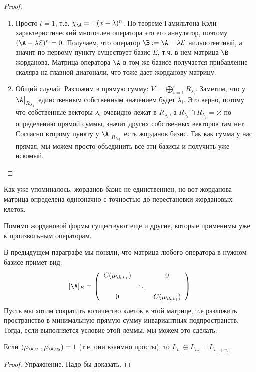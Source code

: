 \begin{proof}
\begin{enumerate}
        \item Просто $t = 1$, т.е. $\chi_{\A} = \pm (x - \lambda)^n$. 
        По теореме Гамильтона-Кэли характеристический многочлен оператора это его аннулятор, поэтому $(\A - \lambda \mathcal{E})^n = 0$. 
        Получаем, что оператор $\B := \A - \lambda \mathcal{E}$ нильпотентный, а значит по первому пункту существует базис $E$, т.ч. в нем матрица $\B$ жорданова. 
        Матрица оператора $\A$ в том же базисе получается прибавление скаляра на главной диагонали, что тоже дает жорданову матрицу.
        
        \item Общий случай. Разложим в прямую сумму: $V = \bigoplus\limits_{i = 1}^{r} R_{\lambda_i}$.
        Заметим, что у $\A \big|_{R_{\lambda_i}}$ единственным собственным значением будет $\lambda_i$.
        Это верно, потому что собственные векторы $\lambda_i$ очевидно лежат в $R_{\lambda_i}$, а $R_{\lambda_i} \cap R_{\lambda_j} = \varnothing$ по определению прямой суммы, значит других собственных векторов там нет.
        Согласно второму пункту у $\A \big|_{R_{\lambda_i}}$ есть жорданов базис.
        Так как сумма у нас прямая, мы можем просто объединить все эти базисы и получить уже искомый.
    \end{enumerate}
\end{proof}

\notice Как уже упоминалось, жорданов базис не единственнен, но вот жорданова матрица определена однозначно с точностью до перестановки жордановых клеток. 

\vspace*{5mm}

Помимо жордановой формы существуют еще и другие, которые применимы уже к произвольным операторам.

В предыдущем параграфе мы поняли, что матрица любого оператора в нужном базисе примет вид:
\[
  [ \A ]_{E} = \left(\begin{array}{ccc}
  C(\mu_{\A, v_1}) &  & 0 \\ 
   & \ddots &  \\ 
  0 &  & C(\mu_{\A, v_t})
  \end{array}\right)  
\]
Пусть мы хотим сократить количество клеток в этой матрице, т.е разложить пространство в минимальную прямую сумму инвариантных подпространств.
Тогда, если выполняется условие этой леммы, мы можем это сделать:
\begin{lemma}
    Если $(\mu_{\A, v_1}, \mu_{\A, v_2}) = 1$ (т.е. они взаимно просты), то $L_{v_1} \oplus L_{v_2} = L_{v_1 + v_2}$.
\end{lemma}
\begin{proof}
    Упражнение. Надо бы доказать.
\end{proof}

